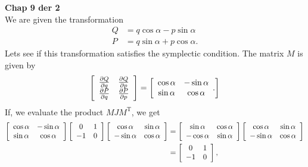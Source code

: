 \documentclass[10pt]{article}
\begin{document}
\textbf{Chap 9 der 2}\\
We are given the transformation
\begin{align*}
  Q &= q\cos\alpha - p\sin\alpha\\
  P &= q\sin\alpha + p\cos\alpha.
\end{align*}
Lets see if this transformation satisfies the symplectic condition.  The matrix
$M$ is given by
\begin{align*}
  \left[ 
  \begin{array}[h]{c c}
    \frac{\partial Q}{\partial{q}}& \frac{\partial Q}{\partial{p}}\\
    \frac{\partial P}{\partial{q}}& \frac{\partial P}{\partial{p}}\\
  \end{array}
  \right]
  =
  \left[ 
  \begin{array}[h]{c c}
    \cos\alpha& -\sin\alpha\\
    \sin\alpha& \cos\alpha
  \end{array}.
  \right]
\end{align*}
If, we evaluate the product $MJM^{\mathrm{T}}$, we get
\begin{align*}
  \left[ 
  \begin{array}[h]{c c}
    \cos\alpha& -\sin\alpha\\
    \sin\alpha& \cos\alpha
  \end{array}
  \right]
  \left[ 
  \begin{array}[h]{c c}
    0& 1\\
    -1& 0
  \end{array}
  \right]
  \left[ 
  \begin{array}[h]{c c}
    \cos\alpha& \sin\alpha\\
    -\sin\alpha& \cos\alpha
  \end{array}
  \right]
  &=
  \left[ 
  \begin{array}[h]{c c}
    \sin\alpha& \cos\alpha\\
    -\cos\alpha& \sin\alpha
  \end{array}
  \right]
  \left[ 
  \begin{array}[h]{c c}
    \cos\alpha& \sin\alpha\\
    -\sin\alpha& \cos\alpha
  \end{array}
  \right]
  \\
  &=
  \left[ 
  \begin{array}[h]{c c}
    0& 1\\
    -1& 0
  \end{array}
  \right],
\end{align*}
\end{document}
